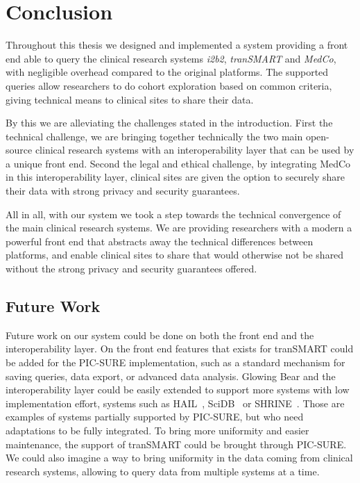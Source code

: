 \chapter{Conclusion}
\label{sec:conclusion}

Throughout this thesis we designed and implemented a system providing a front end able to query the clinical research systems \emph{i2b2}, \emph{tranSMART} and \emph{MedCo}, with negligible overhead compared to the original platforms.
The supported queries allow researchers to do cohort exploration based on common criteria, giving technical means to clinical sites to share their data.

%
By this we are alleviating the challenges stated in the introduction.
First the technical challenge, we are bringing together technically the two main open-source clinical research systems with an interoperability layer that can be used by a unique front end.
Second the legal and ethical challenge, by integrating MedCo in this interoperability layer, clinical sites are given the option to securely share their data with strong privacy and security guarantees.

All in all, with our system we took a step towards the technical convergence of the main clinical research systems.
We are providing researchers with a modern a powerful front end that abstracts away the technical differences between platforms, and enable clinical sites to share that would otherwise not be shared without the strong privacy and security guarantees offered. 



\section{Future Work}
\label{sec:futurework}

Future work on our system could be done on both the front end and the interoperability layer.
On the front end features that exists for tranSMART could be added for the PIC-SURE implementation, such as a standard mechanism for saving queries, data export, or advanced data analysis.
Glowing Bear and the interoperability layer could be easily extended to support more systems with low implementation effort, systems such as HAIL~\cite{hail}, SciDB~\cite{brown2010overview} or SHRINE~\cite{shrine}.
Those are examples of systems partially supported by PIC-SURE, but who need adaptations to be fully integrated.
To bring more uniformity and easier maintenance, the support of tranSMART could be brought through PIC-SURE.
We could also imagine a way to bring uniformity in the data coming from clinical research systems, allowing to query data from multiple systems at a time.

